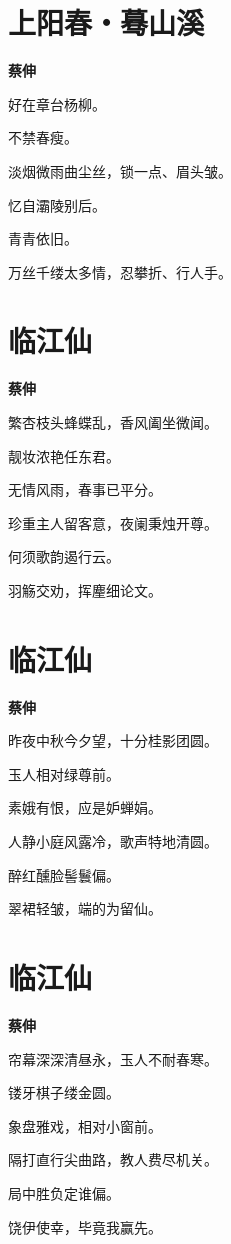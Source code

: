 \documentclass[12pt,a4paper]{ctexbook}
\begin{document}
\section{上阳春・蓦山溪}
\textbf{蔡伸}\par\vspace{0.5em}
好在章台杨柳。\par
不禁春瘦。\par
淡烟微雨曲尘丝，锁一点、眉头皱。\par
忆自灞陵别后。\par
青青依旧。\par
万丝千缕太多情，忍攀折、行人手。\par

\section{临江仙}
\textbf{蔡伸}\par\vspace{0.5em}
繁杏枝头蜂蝶乱，香风阖坐微闻。\par
靓妆浓艳任东君。\par
无情风雨，春事已平分。\par
珍重主人留客意，夜阑秉烛开尊。\par
何须歌韵遏行云。\par
羽觞交劝，挥麈细论文。\par

\section{临江仙}
\textbf{蔡伸}\par\vspace{0.5em}
昨夜中秋今夕望，十分桂影团圆。\par
玉人相对绿尊前。\par
素娥有恨，应是妒蝉娟。\par
人静小庭风露冷，歌声特地清圆。\par
醉红醺脸髻鬟偏。\par
翠裙轻皱，端的为留仙。\par

\section{临江仙}
\textbf{蔡伸}\par\vspace{0.5em}
帘幕深深清昼永，玉人不耐春寒。\par
镂牙棋子缕金圆。\par
象盘雅戏，相对小窗前。\par
隔打直行尖曲路，教人费尽机关。\par
局中胜负定谁偏。\par
饶伊使幸，毕竟我赢先。\par
\end{document}
